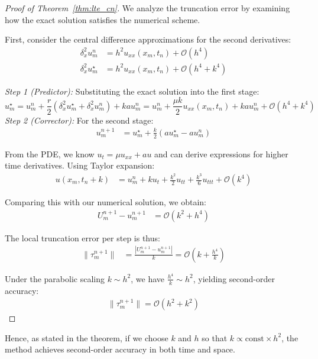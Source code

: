\begin{proof}[Proof of Theorem~\ref{thm:lte_cn}]
  We analyze the truncation error by examining how the exact solution satisfies the numerical scheme.

  First, consider the central difference approximations for the second derivatives:
  \begin{align*}
    \delta_x^2 u_m^n     & = h^2u_{xx}(x_m,t_n) + \mathcal{O}(h^4)       \\
    \delta_x^2 u_m^\star & = h^2u_{xx}(x_m,t_n) + \mathcal{O}(h^4 + k^4)
  \end{align*}

  \textit{Step 1 (Predictor):} Substituting the exact solution into the first stage:
  \begin{equation}
    u_m^\star = u_m^n + \frac{r}{2}\left(\delta_x^2 u_m^\star + \delta_x^2 u_m^n\right) + kau_m^n = u_m^n + \frac{\mu k}{2}u_{xx}(x_m,t_n) + kau_m^n + \mathcal{O}(h^4 + k^4)
  \end{equation}
  \textit{Step 2 (Corrector):} For the second stage:
  \begin{align*}
    u_m^{n+1} & = u_m^\star + \frac{k}{2}(au_m^\star - au_m^n)
  \end{align*}

  From the PDE, we know $u_t = \mu u_{xx} + au$ and can derive expressions for higher time derivatives. Using Taylor expansion:
  \begin{align*}
    u(x_m,t_n+k) & = u_m^n + ku_t + \frac{k^2}{2}u_{tt} + \frac{k^3}{6}u_{ttt} + \mathcal{O}(k^4)
  \end{align*}

  Comparing this with our numerical solution, we obtain:
  \begin{align*}
    U_m^{n+1} - u_m^{n+1} & = \mathcal{O}(k^2 + h^4)
  \end{align*}

  The local truncation error per step is thus:
  \begin{align*}
    \|\tau_m^{n+1}\| & = \frac{|U_m^{n+1} - u_m^{n+1}|}{k} = \mathcal{O}\left(k + \frac{h^4}{k}\right)
  \end{align*}

  Under the parabolic scaling $k \sim h^2$, we have $\frac{h^4}{k} \sim h^2$, yielding second-order accuracy:
  \begin{align*}
    \|\tau_m^{n+1}\| = \mathcal{O}(h^2 + k^2)
  \end{align*}
\end{proof}
Hence, as stated in the theorem, if we choose \(k\) and \(h\) so that \(k \propto \mathrm{const}\times h^2\),
the method achieves second-order accuracy in both time and space.
